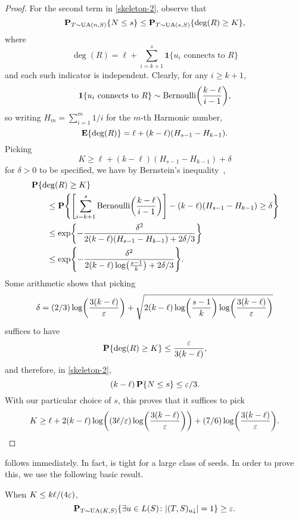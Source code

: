 \begin{proof}
  For the second term in \eqref{skeleton-2}, observe that
  \[
    \operatorname{\mathbf{P}}_{T \sim \operatorname{UA}(n, S)} \{N \le s\} \le \operatorname{\mathbf{P}}_{T \sim \operatorname{UA}(s, S)}\{\deg(R) \ge K \} ,
  \]
  where
  \[
    \deg(R) = \ell + \sum_{i = k + 1}^s \mathbf{1}\{u_i \text{ connects to $R$} \} 
  \]
  and each such indicator is independent. Clearly, for any
  $i \ge k + 1$,
  \[
    \mathbf{1}\{u_i \text{ connects to $R$}\} \sim \Ber\left( \frac{k -
        \ell}{i - 1} \right) ,
  \]
  so writing $H_m = \sum_{i = 1}^m 1/i$ for the $m$-th Harmonic
  number,
  \[
    \operatorname{\mathbf{E}}\{\deg(R)\} = \ell + (k - \ell)(H_{s - 1} - H_{k - 1}) .
  \]
  Picking
  \[
    K \ge \ell + (k - \ell) (H_{s - 1} - H_{k - 1}) + \delta
  \]
  for $\delta > 0$ to be specified, we have by Bernstein's
  inequality~\cite{bernstein, gabor-concentration},
  \begin{align*}
    &\Pr\{\deg(R) \ge K\} \\
    &\qquad \le \Pr \left\{ \left[ \sum_{i = k + 1}^s \Ber\left(\frac{k - \ell}{i - 1}\right) \right] - (k - \ell)(H_{s - 1} - H_{k - 1}) \ge \delta \right\} \\
    &\qquad \le \exp \left\{ - \frac{\delta^2}{2 (k - \ell) (H_{s - 1} - H_{k - 1}) + 2 \delta/3} \right\} \\
    &\qquad \le \exp \left\{ - \frac{\delta^2}{2 (k - \ell) \log \left(\frac{s - 1}{k}\right) + 2 \delta/3} \right\} .
  \end{align*}
  Some arithmetic shows that picking
  \[
    \delta = (2/3) \log \left( \frac{3 (k - \ell)}{\eps} \right) + \sqrt{2 (k - \ell) \log \left(\frac{s - 1}{k}\right) \log \left(\frac{3(k - \ell)}{\eps}\right)}
  \]
  suffices to have
  \[
    \operatorname{\mathbf{P}}\{\deg(R) \ge K\} \le \frac{\varepsilon}{3(k - \ell)} ,
  \]
  and therefore, in \eqref{skeleton-2},
  \[
    (k - \ell) \operatorname{\mathbf{P}}\{N \le s\} \le \varepsilon/3 .
  \]
  With our particular choice of $s$, this proves that it suffices to pick
  \[
    K \ge \ell + 2 (k - \ell) \log \left( (3 \ell/\eps) \log \left( \frac{3 (k - \ell)}{\eps}\right)\right) + (7/6) \log \left( \frac{3 (k - \ell)}{\eps} \right) . \qedhere
  \]
\end{proof}
 follows immediately. In fact,
 is tight for a large class of seeds. In
order to prove this, we use the following basic result.
\begin{lem}
  When $K \le k \ell/(4 \varepsilon)$,
  \[
    \operatorname{\mathbf{P}}_{T \sim \operatorname{UA}(K, S)}\{\exists u \in L(S) \colon |(T, S)_{u \downarrow}| = 1 \} \ge \varepsilon .
  \]
\end{lem}
